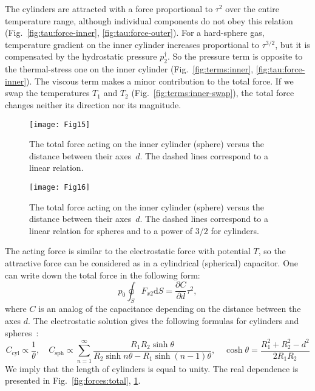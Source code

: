 \documentclass[smallextended]{svjour3} %
\newcommand{\dd}{\mathrm{d}}
\newcommand{\pder}[2][]{\frac{\partial#1}{\partial#2}}
\begin{document}
The cylinders are attracted with a force proportional to \(\tau^2\) over the entire temperature range,
although individual components do not obey this relation (Fig.~\ref{fig:tau:force-inner}, \ref{fig:tau:force-outer}).
For a hard-sphere gas, temperature gradient on the inner cylinder increases proportional to \(\tau^{3/2}\),
but it is compensated by the hydrostatic pressure \(p^\dag_2\).
So the pressure term is opposite to the thermal-stress one on the inner cylinder
(Fig.~\ref{fig:terms:inner}, \ref{fig:tau:force-inner}).
The viscous term makes a minor contribution to the total force.
If we swap the temperatures \(T_1\) and \(T_2\) (Fig.~\ref{fig:terms:inner-swap}),
the total force changes neither its direction nor its magnitude.

\begin{figure}[ht]
    \centering
    \begin{minipage}{.48\textwidth}
        \centering
        \texttt{[image: Fig15]}
        \caption{The total force acting on the inner cylinder (sphere)
                versus the distance between their axes~\(d\).
                The dashed lines correspond to a linear relation.}
        \label{fig:forces:total}
    \end{minipage}
    \quad
    \begin{minipage}{.48\textwidth}
        \centering
        \texttt{[image: Fig16]}
        \caption{The total force acting on the inner cylinder (sphere)
                versus the distance between their axes~\(d\).
                The dashed lines correspond to a linear relation for spheres
                and to a power of \(3/2\) for cylinders.}
        \label{fig:forces:inverse}
    \end{minipage}
\end{figure}

The acting force is similar to the electrostatic force with potential \(T\),
so the attractive force can be considered as in a cylindrical (spherical) capacitor.
One can write down the total force in the following form:
\begin{equation}
    p_0\oint_S F_{x2}\dd{S} = \pder[C]{d} \tau^2,
\end{equation}
where \(C\) is an analog of the capacitance depending on the distance between the axes \(d\).
The electrostatic solution gives the following formulas for cylinders and spheres~\cite{Smythe1968Electricity}:
\begin{equation}
    C_\mathrm{cyl} \propto \frac1{\theta}, \quad
    C_\mathrm{sph} \propto  \sum_{n=1}^\infty \frac{R_1 R_2 \sinh\theta} {R_2\sinh n\theta - R_1\sinh (n-1)\theta}, \quad
    \cosh\theta = \frac{R_1^2 + R_2^2 - d^2}{2 R_1 R_2}
\end{equation}
We imply that the length of cylinders is equal to unity.
The real dependence is presented in Fig.~\ref{fig:forces:total}, \ref{fig:forces:inverse}.
\end{document}
